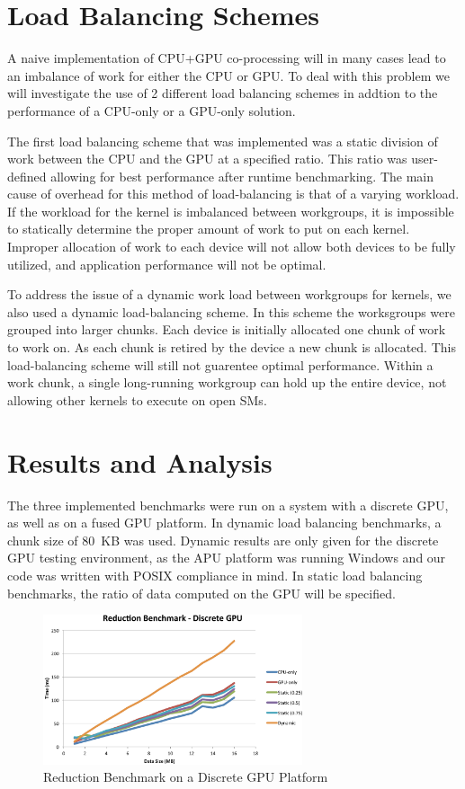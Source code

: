 \documentclass[journal]{IEEEtran}
\begin{document}
\section{Load Balancing Schemes}
A naive implementation of CPU+GPU co-processing will in many cases lead to an imbalance
of work for either the CPU or GPU.  To deal with this problem we will investigate the
use of 2 different load balancing schemes in addtion to the performance of a CPU-only or
a GPU-only solution.

The first load balancing scheme that was implemented was a static division of work between
the CPU and the GPU at a specified ratio.  This ratio was user-defined allowing for best 
performance after runtime benchmarking.  The main cause of overhead for this method of
load-balancing is that of a varying workload.  If the workload for the kernel is imbalanced
between workgroups, it is impossible to statically determine the proper amount of work
to put on each kernel.  Improper allocation of work to each device will not allow both
devices to be fully utilized, and application performance will not be optimal.

To address the issue of a dynamic work load between workgroups for kernels, we also used
a dynamic load-balancing scheme.  In this scheme the worksgroups were grouped into larger
chunks.  Each device is initially allocated one chunk of work to work on.  As each chunk
is retired by the device a new chunk is allocated.  This load-balancing scheme will still
not guarentee optimal performance.  Within a work chunk, a single long-running workgroup
can hold up the entire device, not allowing other kernels to execute on open SMs.

\section{Results and Analysis}
The three implemented benchmarks were run on a system with a discrete GPU, as well as
on a fused GPU platform.  In dynamic load balancing benchmarks, a chunk size of 80~KB
was used.  Dynamic results are only given for the discrete GPU testing environment,
as the APU platform was running Windows and our code was written with POSIX compliance
in mind.  In static load balancing benchmarks, the ratio of data computed on the GPU
will be specified.

\begin{figure}[t]
\centering
\includegraphics[width=3.0in]{reduce_discrete}
\caption{Reduction Benchmark on a Discrete GPU Platform}
\label{fig:reduce_discrete}
\end{figure}
\end{document}
